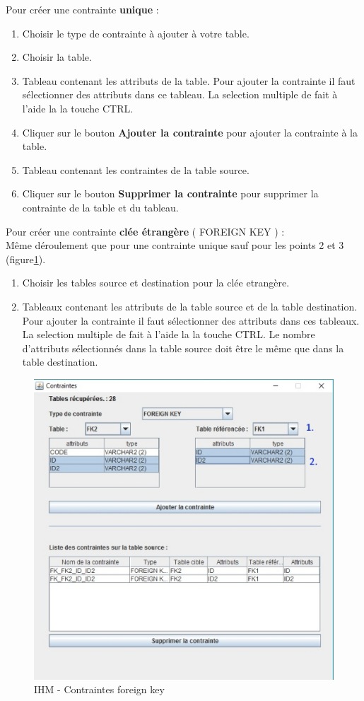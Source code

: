 Pour créer une contrainte \textbf{unique} :
\begin{enumerate}
\item Choisir le type de contrainte à ajouter à votre table.
\item Choisir la table.
\item Tableau contenant les attributs de la table. Pour ajouter la contrainte il faut sélectionner des attributs dans ce tableau. La selection multiple de fait à l'aide la la touche CTRL.
\item Cliquer sur le bouton \textbf{Ajouter la contrainte} pour ajouter la contrainte à la table.
\item Tableau contenant les contraintes de la table source.
\item Cliquer sur le bouton \textbf{Supprimer la contrainte} pour supprimer la contrainte de la table et du tableau.
\end{enumerate}

Pour créer une contrainte \textbf{clée étrangère} ( FOREIGN KEY ) :\\
Même déroulement que pour une contrainte unique sauf pour les points 2 et 3 (figure\ref{contraintes_fk_gui}).

\begin{enumerate}
\item Choisir les tables source et destination pour la clée etrangère.
\item Tableaux contenant les attributs de la table source et de la table destination. Pour ajouter la contrainte il faut sélectionner des attributs dans ces tableaux. La selection multiple de fait à l'aide la la touche CTRL. Le nombre d'attributs sélectionnés dans la table source doit être le même que dans la table destination.
\end{enumerate}

\begin{figure}[!h]
\centering
\includegraphics[width=12cm]{./images/manuel/contraintes_fk.eps}
\caption{IHM - Contraintes foreign key}
\label{contraintes_fk_gui}
\end{figure}



